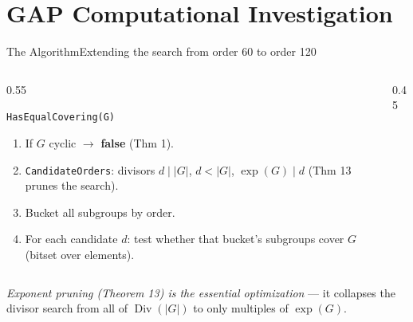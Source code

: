 \documentclass[9pt,aspectratio=169]{beamer}
\begin{document}
\section{GAP Computational Investigation}

\begin{frame}{The Algorithm}{Extending the search from order 60 to order 120}
\begin{columns}[T]
\begin{column}{0.55\textwidth}
\begin{block}{\texttt{HasEqualCovering(G)}}
\begin{enumerate}
\item If $G$ cyclic $\to$ \textbf{false} (Thm 1).
\item \texttt{CandidateOrders}: divisors $d\mid|G|$, $d<|G|$, $\exp(G)\mid d$ (Thm 13 prunes the search).
\item Bucket all subgroups by order.
\item For each candidate $d$: test whether that bucket's subgroups cover $G$ (bitset over elements).
\end{enumerate}
\end{block}
\end{column}
\begin{column}{0.45\textwidth}
\end{column}
\end{columns}
\vspace{4pt}
\textit{Exponent pruning (Theorem 13) is the essential optimization} — it collapses the divisor search from all of $\operatorname{Div}(|G|)$ to only multiples of $\exp(G)$.
\end{frame}
\end{document}
